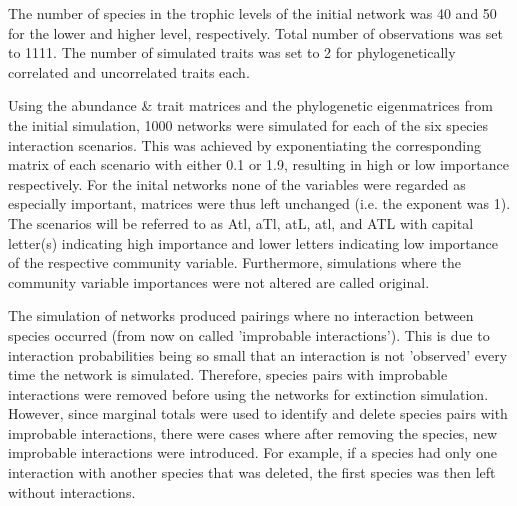 \documentclass[12pt,a4paper]{article}
\begin{document}
The number of species in the trophic levels of the initial network was 40 and 50 for the lower and higher level, respectively. Total number of observations was set to 1111. The number of simulated traits was set to 2 for phylogenetically correlated and uncorrelated traits each.
	

	Using the abundance \& trait matrices and the phylogenetic eigenmatrices from the initial simulation, 1000 networks were simulated for each of the six species interaction scenarios. This was achieved by exponentiating the corresponding matrix of each scenario with either 0.1 or 1.9, resulting in high or low importance respectively. For the inital networks none of the variables were regarded as especially important, matrices were thus left unchanged (i.e. the exponent was 1). The scenarios will be referred to as Atl, aTl, atL, atl, and ATL with capital letter(s) indicating high importance and lower letters indicating low importance of the respective community variable. Furthermore, simulations where the community variable importances were not altered are called original.
	
	 The simulation of networks produced pairings where no interaction between species occurred (from now on called 'improbable interactions'). This is due to interaction probabilities being so small that an interaction is not 'observed' every time the network is simulated. Therefore, species pairs with improbable interactions were removed before using the networks for extinction simulation. However, since marginal totals were used to identify and delete species pairs with improbable interactions, there were cases where after removing the species, new improbable interactions were introduced. For example, if a species had only one interaction with another species that was deleted, the first species was then left without interactions.
	 
\end{document}
